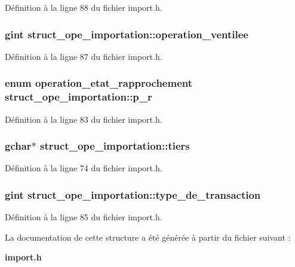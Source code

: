Définition à la ligne 88 du fichier import.h.

\subsubsection[{operation\_\-ventilee}]{\setlength{\rightskip}{0pt plus 5cm}gint {\bf struct\_\-ope\_\-importation::operation\_\-ventilee}}\label{structstruct__ope__importation_ad0311d9f5d7bf9c8837d31614a176742}


Définition à la ligne 87 du fichier import.h.

\subsubsection[{p\_\-r}]{\setlength{\rightskip}{0pt plus 5cm}enum {\bf operation\_\-etat\_\-rapprochement} {\bf struct\_\-ope\_\-importation::p\_\-r}}\label{structstruct__ope__importation_a9b894c7f538103950a23655ff003b5f1}


Définition à la ligne 83 du fichier import.h.

\subsubsection[{tiers}]{\setlength{\rightskip}{0pt plus 5cm}gchar$\ast$ {\bf struct\_\-ope\_\-importation::tiers}}\label{structstruct__ope__importation_a29bbb5cbb09891b7d9b8bcecf635a123}


Définition à la ligne 74 du fichier import.h.

\subsubsection[{type\_\-de\_\-transaction}]{\setlength{\rightskip}{0pt plus 5cm}gint {\bf struct\_\-ope\_\-importation::type\_\-de\_\-transaction}}\label{structstruct__ope__importation_a8eafdd598a1677000d009a7da16b81e6}


Définition à la ligne 85 du fichier import.h.



La documentation de cette structure a été générée à partir du fichier suivant :\begin{DoxyCompactItemize}
\item 
{\bf import.h}\end{DoxyCompactItemize}
